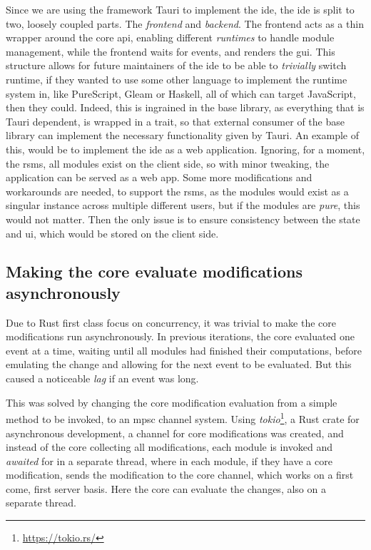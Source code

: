 Since we are using the framework Tauri to implement the \gls*{ide}, the \gls*{ide}
is split to two, loosely coupled parts. The \textit{frontend} and
\textit{backend}. The frontend acts as a thin wrapper around the core \gls*{api},
enabling different \textit{runtimes} to handle module management, while the
frontend waits for events, and renders the \gls*{gui}. This structure allows for
future maintainers of the \gls*{ide} to be able to \textit{trivially} switch
runtime, if they wanted to use some other language to implement the runtime
system in, like PureScript, Gleam or Haskell, all of which can target
JavaScript, then they could. Indeed, this is ingrained in the base library, as
everything that is Tauri dependent, is wrapped in a trait, so that external
consumer of the base library can implement the necessary functionality given by
Tauri. An example of this, would be to implement the \gls*{ide} as a web
application. Ignoring, for a moment, the \gls*{rsms}, all modules exist on the
client side, so with minor tweaking, the application can be served as a web
app. Some more modifications and workarounds are needed, to support the
\gls*{rsms}, as the modules would exist as a singular instance across multiple
different users, but if the modules are \textit{pure}, this would not matter.
Then the only issue is to ensure consistency between the state and \gls*{ui},
which would be stored on the client side.

\subsection{Making the core evaluate modifications asynchronously}

Due to Rust first class focus on concurrency, it was trivial to make the core
modifications run asynchronously. In previous iterations, the core evaluated
one event at a time, waiting until all modules had finished their computations,
before emulating the change and allowing for the next event to be evaluated. But
this caused a noticeable \textit{lag} if an event was long.

This was solved by changing the core modification evaluation from a simple
method to be invoked, to an \gls*{mpsc} channel system. Using \textit{tokio}\footnote{\url{https://tokio.rs/}},
a Rust crate for asynchronous development, a channel for core modifications was
created, and instead of the core collecting all modifications, each module is
invoked and \textit{awaited} for in a separate thread, where in each module, if
they have a core modification, sends the modification to the core channel, which
works on a first come, first server basis. Here the core can evaluate the
changes, also on a separate thread.


